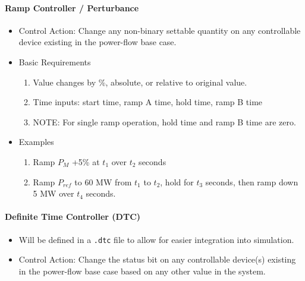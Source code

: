 \documentclass[12pt]{article}
\newcommand{\q}{(\textit{\textbf{?}})}
\begin{document}
\begin{multicols*}{2}
\paragraph{Ramp Controller / Perturbance}
\begin{itemize}
	\item Control Action: Change any non-binary settable quantity on any controllable device existing in the power-flow base case.
	\item Basic Requirements
	\begin{enumerate}
		\item Value changes by \%, absolute, or relative to original value.
		\item Time inputs: start time, ramp A time, hold time, ramp B time
		\item NOTE: For single ramp operation, hold time and ramp B time are zero.
	\end{enumerate}
	\item Examples
	\begin{enumerate}
	\item Ramp $P_{M}$ +5\% at $t_1$ over $t_2$ seconds
	\item Ramp $P_{ref}$ to 60 MW from $t_1$ to $t_2$, hold for $t_3$ seconds, then ramp down 5 MW over $t_4$ seconds.
	\end{enumerate}	
	
\end{itemize}

\vfill\null
\columnbreak
%
\vspace{0pt}
\paragraph{Definite Time Controller (DTC)}
\begin{itemize}
\item Will be defined in a \verb|.dtc| file to allow for easier integration into simulation.

	\item Control Action: Change the status bit on any controllable device(s) existing in the power-flow base case based on any other value in the system.
	

\end{itemize}
\end{multicols*}
\end{document}

